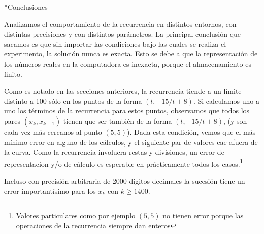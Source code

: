 \documentclass[12pt,titlepage]{article}
\newenvironment{usection}[1]{\newpage\begin{section}*{#1}	\addcontentsline{toc}{section}{#1}}{\end{section}}
\begin{document}
	\begin{usection}{Conclusiones}
		Analizamos el comportamiento de la recurrencia en distintos entornos, con distintas precisiones y con distintos parámetros.
		La principal conclusión que sacamos es que sin importar las condiciones bajo las cuales se realiza el experimento, la solución nunca es exacta.
		Esto se debe a que la representación de los números reales en la computadora es inexacta, porque el almacenamiento es finito.
		
		Como es notado en las secciones anteriores, la recurrencia tiende a un límite distinto a 100 sólo en los puntos de la forma $(t, -15/t + 8)$. Si calculamos uno a uno los términos de la recurrencia para estos puntos, observamos que todos los pares $(x_k,x_{k+1})$ tienen que ser también de la forma $(t, -15/t + 8)$, (y son cada vez más cercanos al punto $(5,5)$).
		Dada esta condición, vemos que el más mínimo error en alguno de los cálculos, y el siguiente par de valores cae afuera de la curva.
		Como la recurrencia involucra restas y divisiones, un error de representacion y/o de cálculo es esperable en prácticamente todos los casos.\footnote{Valores particulares como por ejemplo $(5,5)$ no tienen error porque las operaciones de la recurrencia siempre dan enteros}
		
		Incluso con precisión arbitraria de 2000 digitos decimales la sucesión tiene un error importantísimo para los $x_k$ con $k\geq 1400$.
		
	\end{usection}
	
\end{document}
